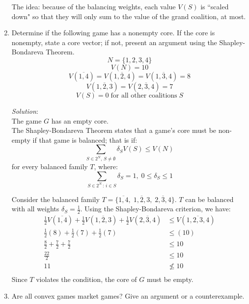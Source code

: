 \documentclass{article}
\begin{document}
\begin{enumerate}
The idea: because of the balancing weights, each value $V(S)$ is ``scaled down" so that they will only sum to the value of the grand coalition, at most.

%
\hfill\newline
\item Determine if the following game has a nonempty core. If the core is nonempty, state a core vector; if not, present an argument using the Shapley-Bondareva Theorem.
$$N = \{1, 2, 3, 4\}$$
$$V(N) = 10$$
$$V(\overline{1, 4}) = V(\overline{1, 2, 4}) = V(\overline{1, 3, 4}) = 8$$
$$V(\overline{1, 2, 3}) = V(\overline{2, 3, 4}) = 7$$
$$V(S) = 0 \; \text{for all other coalitions} \; S$$

\textit{Solution}: \\
The game $G$ has an empty core. \\

The Shapley-Bondareva Theorem states that a game's core must be non-empty if that game is balanced; that is if:
\[ \sum_{S \in 2^{N}, \, S \neq \emptyset}{\delta_S V(S)} \le V(N) \]
for every balanced family $T$, where:
\[ \sum_{S \in 2^{N} \, : \, i \in S}{\delta_{S}} = 1, \; 0 \le \delta_{S} \le 1 \]

Consider the balanced family $T = \{\overline{1, 4},\; \overline{1, 2, 3},\; \overline{2, 3, 4}\}$. $T$ can be balanced with all weights $\delta_{S} = \frac{1}{2}$. Using the Shapley-Bondareva criterion, we have:
\begin{align*}
\frac{1}{2}V(\overline{1, 4}) + \frac{1}{2}V(\overline{1, 2, 3}) + \frac{1}{2}V(\overline{2, 3, 4})  &\le      V(\overline{1, 2, 3, 4}) \\
\frac{1}{2}(8)                + \frac{1}{2}(7)                   + \frac{1}{2}(7)                    &\le      (10) \\
\frac{8}{2}                   + \frac{7}{2}                      + \frac{7}{2}                       &\le      10   \\
\frac{22}{2}                                                                                         &    \le  10   \\
11                                                                                                   &\not\le  10   \\
\end{align*}
Since $T$ violates the condition, the core of $G$ must be empty.

%
\hfill\newline
\item Are all convex games market games? Give an argument or a counterexample. \\


\end{enumerate}
\end{document}
